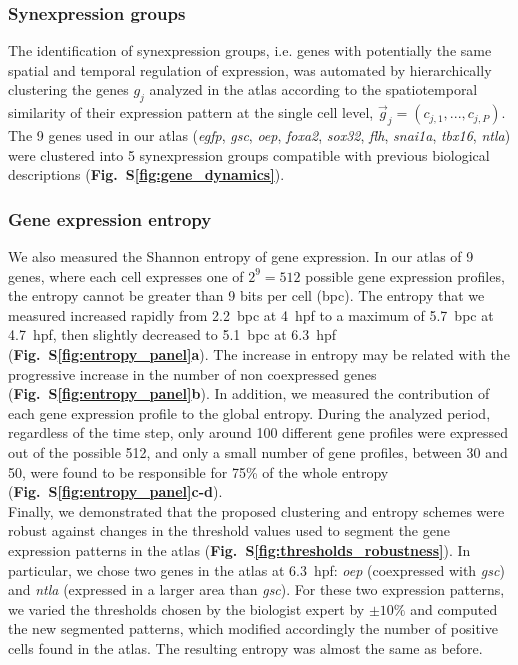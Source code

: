 \subsubsection*{Synexpression groups}



The identification of synexpression groups, i.e. genes with potentially the same spatial and temporal regulation of expression, was automated by hierarchically clustering the genes $g_j$ analyzed in the atlas according to the spatiotemporal similarity of their expression pattern at the single cell level, $\vec{g}_j = (c_{j,1}, ..., c_{j,P})$. The 9 genes used in our atlas (\emph{egfp}, \emph{gsc}, \emph{oep}, \emph{foxa2}, \emph{sox32}, \emph{flh}, \emph{snai1a}, \emph{tbx16}, \emph{ntla}) were clustered into 5 synexpression groups compatible with previous biological descriptions\cite{kudoh2001gene} (\textbf{Fig.~S\ref{fig:gene_dynamics}}).



\subsubsection*{Gene expression entropy}



We also measured the Shannon entropy of gene expression. In our atlas of 9 genes, where each cell expresses one of $2^9=512$ possible gene expression profiles, the entropy cannot be greater than 9 bits per cell (bpc). The entropy that we measured increased rapidly from 2.2~bpc at 4~hpf to a maximum of 5.7~bpc at 4.7~hpf, then slightly decreased to 5.1~bpc at 6.3~hpf (\textbf{Fig.~S\ref{fig:entropy_panel}a}). The increase in entropy may be related with the progressive increase in the number of non coexpressed genes (\textbf{Fig.~S\ref{fig:entropy_panel}b}). In addition, we measured the contribution of each gene expression profile to the global entropy. During the analyzed period, regardless of the time step, only around 100 different gene profiles were expressed out of the possible 512, and only a small number of gene profiles, between 30 and 50, were found to be responsible for 75\% of the whole entropy (\textbf{Fig.~S\ref{fig:entropy_panel}c-d}). \\



Finally, we demonstrated that the proposed clustering and entropy schemes were robust against changes in the threshold values used to segment the gene expression patterns in the atlas (\textbf{Fig.~S\ref{fig:thresholds_robustness}}). In particular, we chose two genes in the atlas at 6.3~hpf: \emph{oep} (coexpressed with \emph{gsc}) and \emph{ntla} (expressed in a larger area than \emph{gsc}). For these two expression patterns, we varied the thresholds chosen by the biologist expert by $\pm10\%$ and computed the new segmented patterns, which modified accordingly the number of positive cells found in the atlas. The resulting entropy was almost the same as before.



